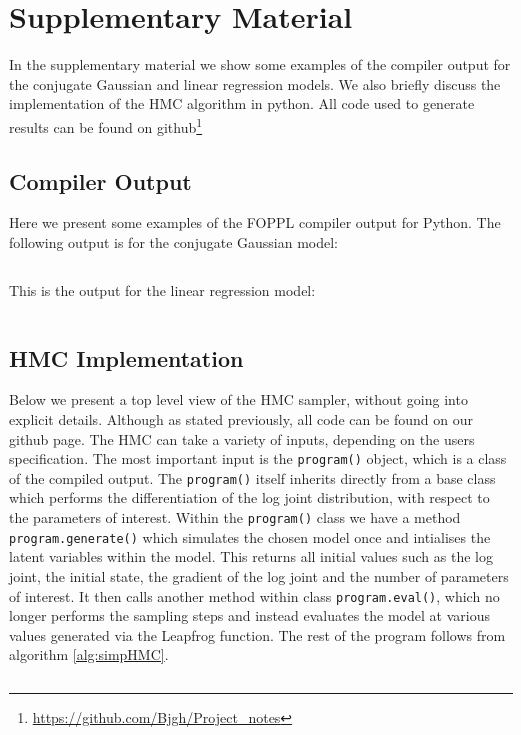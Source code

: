 \documentclass[twoside]{article}
\begin{document}
\section{Supplementary Material}
\label{sec:supmat}

In the supplementary material we show some examples of the compiler output for the conjugate Gaussian and linear regression models. We also briefly discuss the implementation of the HMC algorithm in python.  All code used to generate results can be found on github\footnote{\url{https://github.com/Bjgh/Project_notes}}\\

\subsection{Compiler Output}
Here we present some examples of the FOPPL compiler output for Python. 
The following output is for the conjugate Gaussian model:  
\inputminted{python}{code/cjgauss.py}
This is the output for the linear regression model:
\inputminted{python}{code/lr_out.py}

\subsection{HMC Implementation}

Below we present a top level view of the HMC sampler, without going into explicit details. Although as stated previously, all code can be found on our github page. The HMC can take a variety of inputs, depending on the users specification. The most important input is the \texttt{program()} object, which is a class of the compiled output. The \texttt{program()} itself inherits directly from a base class which performs the differentiation of the log joint distribution, with respect to the parameters of interest. Within the \texttt{program()} class we have a method \texttt{program.generate()} which simulates the chosen model once and intialises the latent variables within the model. This returns all initial values such as the log joint, the initial state, the gradient of the log joint and the number of parameters of interest. It then calls another method within class \texttt{program.eval()}, which no longer performs the sampling steps and instead evaluates the model at various values generated via the Leapfrog function. The rest of the program follows from algorithm \ref{alg:simpHMC}.
 
\inputminted{python}{code/hmc_class.py}
\end{document}
